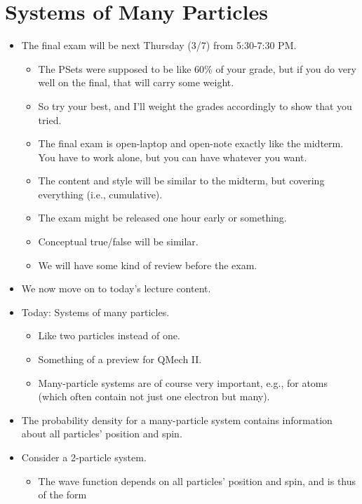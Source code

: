 \documentclass[../notes.tex]{subfiles}
\begin{document}
\section{Systems of Many Particles}
\begin{itemize}
    \item {}The final exam will be next Thursday (3/7) from 5:30-7:30 PM.
    \begin{itemize}
        \item The PSets were supposed to be like 60\% of your grade, but if you do very well on the final, that will carry some weight.
        \item So try your best, and I'll weight the grades accordingly to show that you tried.
        \item The final exam is open-laptop and open-note exactly like the midterm. You have to work alone, but you can have whatever you want.
        \item The content and style will be similar to the midterm, but covering everything (i.e., cumulative).
        \item The exam might be released one hour early or something.
        \item Conceptual true/false will be similar.
        \item We will have some kind of review before the exam.
    \end{itemize}
    \item We now move on to today's lecture content.
    \item Today: Systems of many particles.
    \begin{itemize}
        \item Like two particles instead of one.
        \item Something of a preview for QMech II.
        \item Many-particle systems are of course very important, e.g., for atoms (which often contain not just one electron but many).
    \end{itemize}
    \item The probability density for a many-particle system contains information about all particles' position and spin.
    \item Consider a 2-particle system.
    \begin{itemize}
        \item The wave function depends on all particles' position and spin, and is thus of the form
        \begin{equation*}

\end{equation*}
\end{itemize}
\end{itemize}
\end{document}
